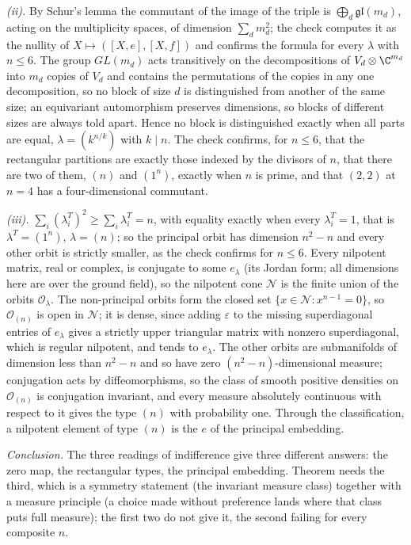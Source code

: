 \emph{(ii).} By Schur's lemma the commutant of the image of the triple is $\bigoplus_d \mathfrak{gl}(m_d)$, acting on the multiplicity spaces, of dimension $\sum_d m_d^2$; the check computes it as the nullity of $X \mapsto ([X,e], [X,f])$ and confirms the formula for every $\lambda$ with $n \leq 6$. The group $GL(m_d)$ acts transitively on the decompositions of $V_d \otimes \C^{m_d}$ into $m_d$ copies of $V_d$ and contains the permutations of the copies in any one decomposition, so no block of size $d$ is distinguished from another of the same size; an equivariant automorphism preserves dimensions, so blocks of different sizes are always told apart. Hence no block is distinguished exactly when all parts are equal, $\lambda = (k^{n/k})$ with $k \mid n$. The check confirms, for $n \leq 6$, that the rectangular partitions are exactly those indexed by the divisors of $n$, that there are two of them, $(n)$ and $(1^n)$, exactly when $n$ is prime, and that $(2,2)$ at $n = 4$ has a four-dimensional commutant.

\emph{(iii).} $\sum_i (\lambda^{T}_i)^2 \geq \sum_i \lambda^{T}_i = n$, with equality exactly when every $\lambda^{T}_i = 1$, that is $\lambda^{T} = (1^n)$, $\lambda = (n)$; so the principal orbit has dimension $n^2 - n$ and every other orbit is strictly smaller, as the check confirms for $n \leq 6$. Every nilpotent matrix, real or complex, is conjugate to some $e_\lambda$ (its Jordan form; all dimensions here are over the ground field), so the nilpotent cone $\mathcal{N}$ is the finite union of the orbits $\mathcal{O}_\lambda$. The non-principal orbits form the closed set $\{x \in \mathcal{N} : x^{n-1} = 0\}$, so $\mathcal{O}_{(n)}$ is open in $\mathcal{N}$; it is dense, since adding $\varepsilon$ to the missing superdiagonal entries of $e_\lambda$ gives a strictly upper triangular matrix with nonzero superdiagonal, which is regular nilpotent, and tends to $e_\lambda$. The other orbits are submanifolds of dimension less than $n^2 - n$ and so have zero $(n^2 - n)$-dimensional measure; conjugation acts by diffeomorphisms, so the class of smooth positive densities on $\mathcal{O}_{(n)}$ is conjugation invariant, and every measure absolutely continuous with respect to it gives the type $(n)$ with probability one. Through the classification, a nilpotent element of type $(n)$ is the $e$ of the principal embedding.

\emph{Conclusion.} The three readings of indifference give three different answers: the zero map, the rectangular types, the principal embedding. Theorem  needs the third, which is a symmetry statement (the invariant measure class) together with a measure principle (a choice made without preference lands where that class puts full measure); the first two do not give it, the second failing for every composite $n$.
